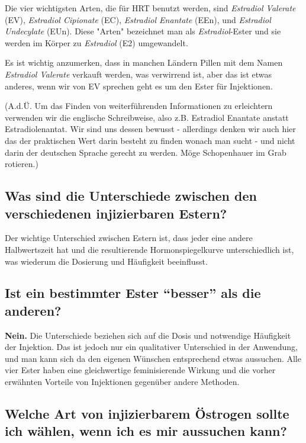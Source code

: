\documentclass{article}
\begin{document}
Die vier wichtigsten Arten, die für HRT benutzt werden, sind \textit{Estradiol Valerate} (EV), \textit{Estradiol Cipionate} (EC), \textit{Estradiol Enantate} (EEn), und \textit{Estradiol Undecylate} (EUn). Diese "Arten" bezeichnet man als \textit{Estradiol}-Ester und sie werden im Körper zu \textit{Estradiol} (E2)  umgewandelt. 

Es ist wichtig anzumerken, dass in manchen Ländern Pillen mit dem Namen \textit{Estradiol Valerate} verkauft werden, was verwirrend ist, aber das ist etwas anderes, wenn wir von EV sprechen geht es um den Ester für Injektionen.

(A.d.Ü. Um das Finden von weiterführenden Informationen zu erleichtern verwenden wir die englische Schreibweise, also z.B. Estradiol Enantate anstatt Estradiolenantat. Wir sind uns dessen bewusst - allerdings denken wir auch hier das der praktischen Wert darin besteht zu finden wonach man sucht - und nicht darin der deutschen Sprache gerecht zu werden. Möge Schopenhauer im Grab rotieren.)

\subsection{Was sind die Unterschiede zwischen den verschiedenen injizierbaren Estern?}

Der wichtige Unterschied zwischen Estern ist, dass jeder eine andere Halbwertszeit hat und die resultierende Hormonspiegelkurve unterschiedlich ist, was wiederum die Dosierung und Häufigkeit beeinflusst.

\subsection{Ist ein bestimmter Ester “besser” als die anderen?}

\textbf{Nein.} Die Unterschiede beziehen sich auf die Dosis und notwendige Häufigkeit der Injektion. Das ist jedoch nur ein qualitativer Unterschied in der Anwendung, und man kann sich da den eigenen Wünschen entsprechend etwas aussuchen. Alle vier Ester haben eine gleichwertige feminisierende Wirkung und die vorher erwähnten Vorteile von Injektionen gegenüber andere Methoden. 

\subsection{Welche Art von injizierbarem Östrogen sollte ich wählen, wenn ich es mir aussuchen kann?}
\end{document}
